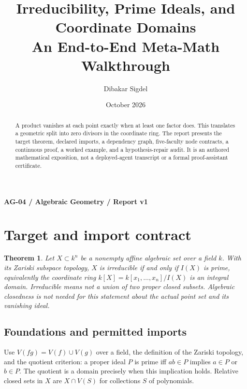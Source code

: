 \documentclass[preprint,12pt,aps,pra,showkeys,amsmath,amssymb,superscriptaddress,floatfix]{revtex4-2}
\newtheorem{theorem}{Theorem}[section]
\theoremstyle{definition}
\theoremstyle{remark}
\begin{document}
\title{Irreducibility, Prime Ideals, and Coordinate Domains\\[4pt]\large An End-to-End Meta-Math Walkthrough}

\author{Dibakar Sigdel}


\date{October 2026}

\begin{abstract}

A product vanishes at each point exactly when at least one factor does.
This translates a geometric split into zero divisors in the coordinate
ring. The report presents the target theorem, declared imports, a
dependency graph, five-faculty node contracts, a continuous proof, a
worked example, and a hypothesis-repair audit. It is an authored
mathematical exposition, not a deployed-agent transcript or a formal
proof-assistant certificate.

\end{abstract}\maketitle\linespread{1.12}\selectfont

\noindent\textbf{AG-04 / Algebraic Geometry / Report v1}

\section{Target and import contract}

\begin{theorem}

Let \(X\subset k^n\) be a nonempty affine algebraic set over a field
\(k\). With its Zariski subspace topology, \(X\) is irreducible if and
only if \(I(X)\) is prime, equivalently the coordinate ring
\(k[X]=k[x_1,\ldots,x_n]/I(X)\) is an integral domain. Irreducible means
not a union of two proper closed subsets. Algebraic closedness is not
needed for this statement about the actual point set and its vanishing
ideal.

\end{theorem}

\subsection{Foundations and permitted imports}

Use \(V(fg)=V(f)\cup V(g)\) over a field, the definition of the Zariski
topology, and the quotient criterion: a proper ideal \(P\) is prime iff
\(ab\in P\) implies \(a\in P\) or \(b\in P\). The quotient is a domain
precisely when this implication holds. Relative closed sets in \(X\) are
\(X\cap V(S)\) for collections \(S\) of polynomials.
\end{document}

